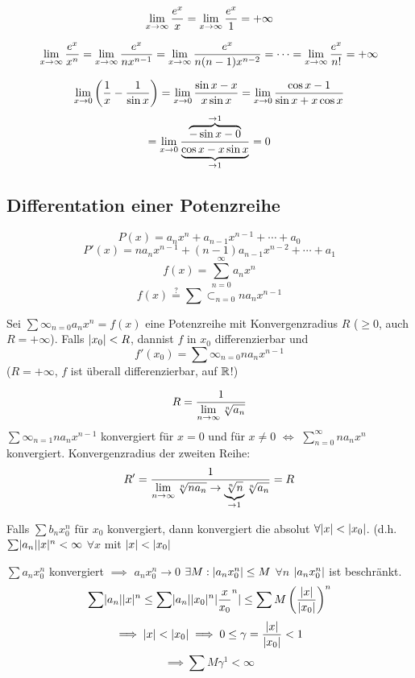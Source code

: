 \begin{Bsp}
  \[\displaystyle\lim_{x\rightarrow\infty}\frac{e^x}{x}=\displaystyle\lim_{x\rightarrow\infty}\frac{e^x}{1}=+\infty\]
\end{Bsp}
\begin{Bsp}
  \[\displaystyle\lim_{x\rightarrow\infty}\frac{e^x}{x^n}=\displaystyle\lim_{x\rightarrow\infty}\frac{e^x}{nx^{n-1}}=\displaystyle\lim_{x\rightarrow\infty}\frac{e^x}{n(n-1)x^{n-2}}=\cdots=\displaystyle\lim_{x\rightarrow\infty}\frac{e^x}{n!}=+\infty\]
\end{Bsp}
\begin{Bsp}
  \[\displaystyle\lim_{x\rightarrow0}\left( \frac{1}{x}-\frac{1}{\sin x} \right)=\displaystyle\lim_{x\rightarrow0}\frac{\sin x-x}{x\sin x}=\displaystyle\lim_{x\rightarrow0}\frac{\cos x-1}{\sin x + x\cos x}\]
  \[=\displaystyle\lim_{x\rightarrow0}\frac{\overbrace{-\sin x-0}^{\to 1}}{\underbrace{\cos x-x\sin x}_{\to 1}}=0\]
\end{Bsp}
\subsection{Differentation einer Potenzreihe}
\[P(x)=a_nx^n+a_{n-1}x^{n-1}+\cdots+a_0\]
\[P'(x)=na_nx^{n-1}+(n-1)a_{n-1}x^{n-2}+\cdots+a_1\]
\[f(x)=\sum^\infty_{n=0}a_nx^n\]
\[f(x)\stackrel{?}{=}\sum\subset_{n=0}na_nx^{n-1}\]
\begin{Sat}
  Sei $\sum\infty_{n=0}a_nx^n=f(x)$ eine Potenzreihe mit Konvergenzradius $R$ ($\geq 0$, auch $R=+\infty$). Falls $\mathopen| x_0 \mathclose|<R$, dannist $f$ in $x_0$ differenzierbar und
  \[f'(x_0)=\sum\infty_{n=0}na_nx^{n-1}\]
  ($R=+\infty$, $f$ ist überall differenzierbar, auf $\mathbb{R}$!)
\end{Sat}
\begin{Bem}
  \[R=\frac{1}{\displaystyle\lim_{n\rightarrow\infty}\sqrt[n]{a_n}}\]
  $\sum\infty_{n=1}n a_n x^{n-1}$ konvergiert für $x=0$ und für $x\neq 0$ $\iff$ $\sum^\infty_{n=0} na_nx^n$ konvergiert. Konvergenzradius der zweiten Reihe:
  \[R'=\frac{1}{\displaystyle\lim_{n\rightarrow\infty}\sqrt[n]{na_n}\to\underbrace{\sqrt[n]{n}}_{\to 1}\sqrt[n]{a_n}}=R\]
\end{Bem}
\begin{Lem}
  Falls $\sum b_nx^n_0$ für $x_0$ konvergiert, dann konvergiert die absolut $\forall \mathopen| x \mathclose|<\mathopen| x_0 \mathclose|$. (d.h. $\sum\mathopen| a_n \mathclose|\mathopen| x \mathclose|^n<\infty$ $\forall x$ mit $\mathopen| x \mathclose|<\mathopen| x_0 \mathclose|$
\end{Lem}
\begin{Bew}
  $\sum a_nx_0^n$ konvergiert $\implies$ $a_nx_0^n\to 0$ $\exists M:\mathopen| a_nx_0^n \mathclose|\leq M$ $\forall n$ $\mathopen| a_nx_0^n \mathclose|$ ist beschränkt.
  \[\sum \mathopen| a_n \mathclose|\mathopen| x \mathclose|^n\leq\sum\mathopen| a_n \mathclose|\mathopen| x_0 \mathclose|^n\mathopen| \frac{x}{x_0}^n \mathclose|\leq\sum M\left( \frac{\mathopen| x \mathclose|}{\mathopen| x_0 \mathclose|} \right)^n\]
  \[\implies \mathopen| x \mathclose|<\mathopen| x_0 \mathclose|\implies 0\leq \gamma=\frac{\mathopen| x \mathclose|}{\mathopen| x_0 \mathclose|}<1\]
  \[\implies \sum M\gamma^1<\infty\]
\end{Bew}
